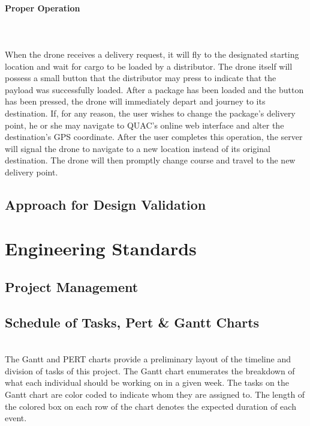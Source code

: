 \documentclass[12pt]{extarticle}
\begin{document}
\paragraph{Proper Operation}
\vspace{-3mm}
\ \\
\ \\
When the drone receives a delivery request, it will fly to the designated starting location and wait for cargo to be loaded by a distributor.  The drone itself will possess a small button that the distributor may press to indicate that the payload was successfully loaded.  After a package has been loaded and the button has been pressed, the drone will immediately depart and journey to its destination. If, for any reason, the user wishes to change the package's delivery point, he or she may navigate to QUAC's online web interface and alter the destination's GPS coordinate.  After the user completes this operation, the server will signal the drone to navigate to a new location instead of its original destination. The drone will then promptly change course and travel to the new delivery point.

\subsection{Approach for Design Validation}

\section{Engineering Standards}

\subsection{Project Management}

\newpage
\subsection{Schedule of Tasks, Pert \& Gantt Charts}

\ \\
The Gantt and PERT charts provide a preliminary layout of the timeline and division of tasks of this project. The Gantt chart enumerates the breakdown of what each individual should be working on in a given week.  The tasks on the Gantt chart are color coded to indicate whom they are assigned to.  The length of the colored box on each row of the chart denotes the expected duration of each event.  
\end{document}
